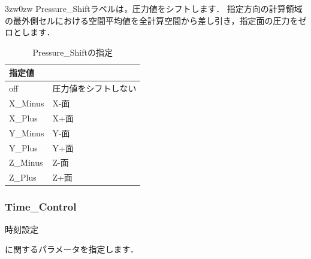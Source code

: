 \begin{indentation}{3zw}{0zw}
Pressure\_Shiftラベルは，圧力値をシフトします．
指定方向の計算領域の最外側セルにおける空間平均値を全計算空間から差し引き，指定面の圧力をゼロとします．

\begin{table}[htdp]
\caption{Pressure\_Shiftの指定}
\begin{center}
\small
\begin{tabular}{ll} \toprule
指定値 & \\ \midrule
off & 圧力値をシフトしない\\
X\_Minus & X-面\\
X\_Plus & X+面\\
Y\_Minus & Y-面\\
Y\_Plus & Y+面\\
Z\_Minus & Z-面\\
Z\_Plus & Z+面\\ \bottomrule
\end{tabular}
\end{center}
\label{tbl:steady}
\end{table}


\end{indentation}



\pagebreak
\subsubsection{Time\_Control}

\hypertarget{tgt:time_control}{時刻設定}に関するパラメータを指定します．

